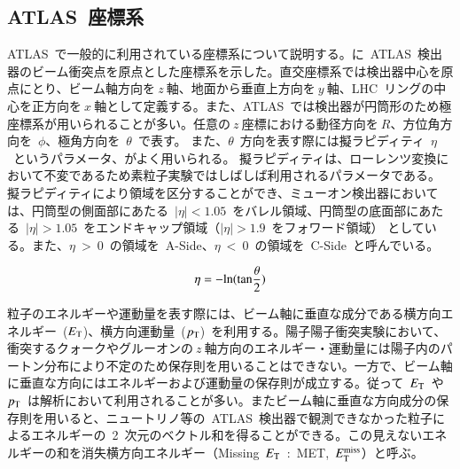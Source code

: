 \subsection{ATLAS~座標系}
ATLAS~で一般的に利用されている座標系について説明する。に~ATLAS~検出器のビーム衝突点を原点とした座標系を示した。直交座標系では検出器中心を原点にとり、ビーム軸方向を$~z~$軸、地面から垂直上方向を$~y~$軸、LHC~リングの中心を正方向を$~x~$軸として定義する。また、ATLAS~では検出器が円筒形のため極座標系が用いられることが多い。任意の$~z~$座標における動径方向を$~R$、方位角方向を~$\phi$、極角方向を~$\theta$~で表す。
また、$\theta$~方向を表す際には擬ラピディティ~$\eta$~というパラメータ、がよく用いられる。
擬ラピディティは、ローレンツ変換において不変であるため素粒子実験ではしばしば利用されるパラメータである。
擬ラピディティにより領域を区分することができ、ミューオン検出器においては、円筒型の側面部にあたる~$|\eta|<1.05$~をバレル領域、円筒型の底面部にあたる~$|\eta|>1.05$~をエンドキャップ領域（$|\eta|>1.9$~をフォワード領域）
としている。また、$\eta~>~0$~の領域を~A-Side、$\eta~<~0$~の領域を~C-Side~と呼んでいる。

\begin{align}
    \eta = -\rm{ln}(\rm{tan}\frac{\theta}{2}) \label{eq:eta}
\end{align}

粒子のエネルギーや運動量を表す際には、ビーム軸に垂直な成分である横方向エネルギー~($E_{\rm{T}}$)、横方向運動量~($p_{\rm{T}}$)~を利用する。陽子陽子衝突実験において、衝突するクォークやグルーオンの$~z~$軸方向のエネルギー・運動量には陽子内のパートン分布により不定のため保存則を用いることはできない。一方で、ビーム軸に垂直な方向にはエネルギーおよび運動量の保存則が成立する。従って~$E_{\rm{T}}$~や~$p_{\rm{T}}$~は解析において利用されることが多い。またビーム軸に垂直な方向成分の保存則を用いると、ニュートリノ等の~ATLAS~検出器で観測できなかった粒子によるエネルギーの~2~次元のベクトル和を得ることができる。この見えないエネルギーの和を消失横方向エネルギー（Missing~$E_{\rm{T}}$~:~MET,~$E^{\rm miss}_{\rm{T}}$）と呼ぶ。

